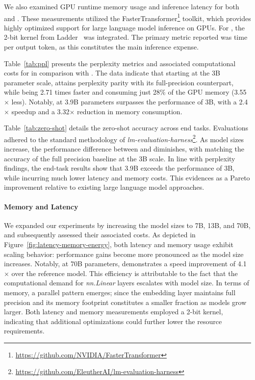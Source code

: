 We also examined GPU runtime memory usage and inference latency for both  and . These measurements utilized the FasterTransformer\footnote{\url{https://github.com/NVIDIA/FasterTransformer}} toolkit, which provides highly optimized support for large language model inference on GPUs. For , the 2-bit kernel from Ladder~\cite{ladder} was integrated. The primary metric reported was time per output token, as this constitutes the main inference expense.

Table~\ref{tab:ppl} presents the perplexity metrics and associated computational costs for  in comparison with . The data indicate that starting at the 3B parameter scale,  attains perplexity parity with its full-precision counterpart, while being 2.71 times faster and consuming just 28\% of the GPU memory (3.55$\times$ less). Notably,  at 3.9B parameters surpasses the performance of  3B, with a 2.4$\times$ speedup and a 3.32$\times$ reduction in memory consumption.

Table~\ref{tab:zero-shot} details the zero-shot accuracy across end tasks. Evaluations adhered to the standard methodology of \emph{lm-evaluation-harness}\footnote{\url{https://github.com/EleutherAI/lm-evaluation-harness}}. As model sizes increase, the performance difference between  and  diminishes, with  matching the accuracy of the full precision baseline at the 3B scale. In line with perplexity findings, the end-task results show that  3.9B exceeds the performance of  3B, while incurring much lower latency and memory costs. This evidences  as a Pareto improvement relative to existing large language model approaches.

\paragraph{Memory and Latency}

We expanded our experiments by increasing the model sizes to 7B, 13B, and 70B, and subsequently assessed their associated costs. As depicted in Figure~\ref{fig:latency-memory-energy}, both latency and memory usage exhibit scaling behavior: performance gains become more pronounced as the model size increases. Notably, at 70B parameters,  demonstrates a speed improvement of 4.1$\times$ over the  reference model. This efficiency is attributable to the fact that the computational demand for \emph{nn.Linear} layers escalates with model size. In terms of memory, a parallel pattern emerges; since the embedding layer maintains full precision and its memory footprint constitutes a smaller fraction as models grow larger. Both latency and memory measurements employed a 2-bit kernel, indicating that additional optimizations could further lower the resource requirements.

